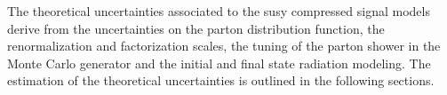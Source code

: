The theoretical uncertainties associated to the \gls{susy} compressed signal
models derive from the uncertainties on the parton distribution function, the
renormalization and factorization scales, the tuning of the parton shower in the
Monte Carlo generator and the initial and final state radiation modeling. The
estimation of the theoretical uncertainties is outlined in the following
sections.
